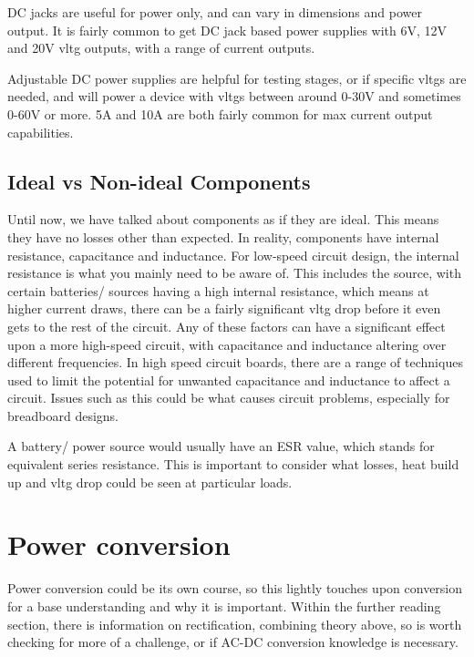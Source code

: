 \documentclass[a4paper,11pt]{report}
\begin{document}
DC jacks are useful for power only, and can vary in dimensions and power output. It is fairly common to get DC jack based power supplies with 6V, 12V and 20V \gls{vltg} outputs, with a range of current outputs.

Adjustable DC power supplies are helpful for testing stages, or if specific \gls{vltg}s are needed, and will power a device with \gls{vltg}s between around 0-30V and sometimes 0-60V or more. 5A and 10A are both fairly common for max current output capabilities.

\subsection{Ideal vs Non-ideal Components}

Until now, we have talked about components as if they are ideal. This means they have no losses other than expected. In reality, components have internal resistance, capacitance and inductance. For low-speed circuit design, the internal resistance is what you mainly need to be aware of. This includes the source, with certain batteries/ sources having a high internal resistance, which means at higher current draws, there can be a fairly significant \gls{vltg} drop before it even gets to the rest of the circuit. Any of these factors can have a significant effect upon a more high-speed circuit, with capacitance and inductance altering over different frequencies. In high speed circuit boards, there are a range of techniques used to limit the potential for unwanted capacitance and inductance to affect a circuit. Issues such as this could be what causes circuit problems, especially for breadboard designs.

A battery/ power source would usually have an ESR value, which stands for equivalent series resistance. This is important to consider what losses, heat build up and \gls{vltg} drop could be seen at particular loads.

\section{Power conversion}

Power conversion could be its own course, so this lightly touches upon conversion for a base understanding and why it is important. Within the further reading section, there is information on rectification, combining theory above, so is worth checking for more of a challenge, or if AC-DC conversion knowledge is necessary.
\end{document}
